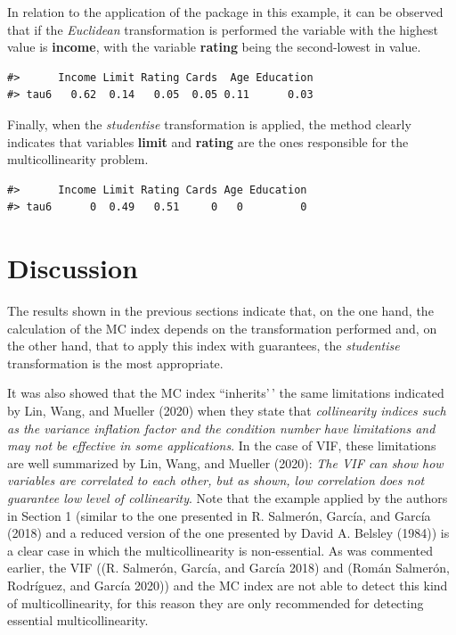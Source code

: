 In relation to the application of the  package in this example, it can be observed that if the \emph{Euclidean} transformation is performed the variable with the highest value is \textbf{income}, with the variable \textbf{rating} being the second-lowest in value.

\begin{verbatim}
#>      Income Limit Rating Cards  Age Education
#> tau6   0.62  0.14   0.05  0.05 0.11      0.03
\end{verbatim}

Finally, when the \emph{studentise} transformation is applied, the method clearly indicates that variables \textbf{limit} and \textbf{rating} are the ones responsible for the multicollinearity problem.

\begin{verbatim}
#>      Income Limit Rating Cards Age Education
#> tau6      0  0.49   0.51     0   0         0
\end{verbatim}

\hypertarget{discussion}{%
\section{Discussion}\label{discussion}}

The results shown in the previous sections indicate that, on the one hand, the calculation of the MC index depends on the transformation performed and, on the other hand, that to apply this index with guarantees, the \emph{studentise} transformation is the most appropriate.

It was also showed that the MC index ``inherits'\,' the same limitations indicated by Lin, Wang, and Mueller (2020) when they state that \emph{collinearity indices such as the variance inflation factor and the condition number have limitations and may not be effective in some applications}. In the case of VIF, these limitations are well summarized by Lin, Wang, and Mueller (2020): \emph{The VIF can show how variables are correlated to each other, but as shown, low correlation does not guarantee low level of collinearity}.
Note that the example applied by the authors in Section 1 (similar to the one presented in R. Salmerón, García, and García (2018) and a reduced version of the one presented by David A. Belsley (1984)) is a clear case in which the multicollinearity is non-essential. As was commented earlier, the VIF ((R. Salmerón, García, and García 2018) and (Román Salmerón, Rodríguez, and García 2020)) and the MC index are not able to detect this kind of multicollinearity, for this reason they are only recommended for detecting essential multicollinearity.

